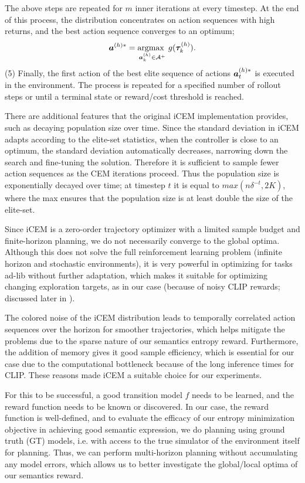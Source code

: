 The above steps are repeated for \(m\) inner iterations at every timestep.
At the end of this process, the distribution concentrates on action sequences with high returns, and the best action sequence converges to an optimum;
\begin{equation}
    \label{eq:planning-goal}
    \bm{a}^{(h)*} = \operatorname*{argmax~}_{\bm{a}^{(h)}_k \in \mathcal{A}^+} g(\bm{\tau}^{(h)}_k).
\end{equation}
(5) Finally, the first action of the best elite sequence of actions \(\bm{a}^{(h)*}_t\) is executed in the environment.
The process is repeated for a specified number of rollout steps or until a terminal state or reward/cost threshold is reached.

There are additional features that the original iCEM implementation provides, such as decaying population size over time. 
Since the standard deviation in iCEM adapts according to the elite-set statistics, when the controller is close to an optimum, the standard deviation automatically decreases, narrowing down the search and fine-tuning the solution.
Therefore it is sufficient to sample fewer action sequences as the CEM iterations proceed.
Thus the population size is exponentially decayed over time; at timestep \(t\) it is equal to \(max(n \delta^{-t}, 2K)\), where the max ensures that the population size is at least double the size of the elite-set.

Since iCEM is a zero-order trajectory optimizer with a limited sample budget and finite-horizon planning, we do not necessarily converge to the global optima.
Although this does not solve the full reinforcement learning problem (infinite horizon and stochastic environments), it is very powerful in optimizing for tasks ad-lib without further adaptation, which makes it suitable for optimizing changing exploration targets, as in our case (because of noisy CLIP rewards; discussed later in ).

The colored noise of the iCEM distribution leads to temporally correlated action sequences over the horizon for smoother trajectories, which helps mitigate the problems due to the sparse nature of our semantics entropy reward.
Furthermore, the addition of memory gives it good sample efficiency, which is essential for our case due to the computational bottleneck because of the long inference times for CLIP.
These reasons made iCEM a suitable choice for our experiments.

For this to be successful, a good transition model \(f\) needs to be learned, and the reward function needs to be known or discovered.
In our case, the reward function is well-defined, and to evaluate the efficacy of our entropy minimization objective in achieving good semantic expression,
we do planning using ground truth (GT) models, i.e. with access to the true simulator of the environment itself for planning.
Thus, we can perform multi-horizon planning without accumulating any model errors, which allows us to better investigate the global/local optima of our semantics reward. 

